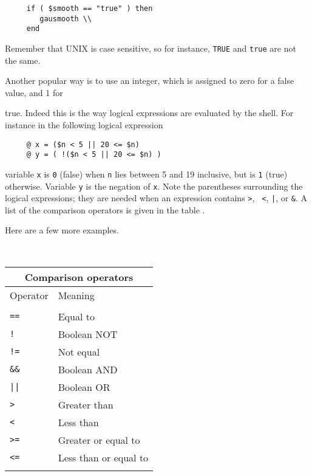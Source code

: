 \small
\begin{verbatim}
     if ( $smooth == "true" ) then
        gausmooth \\
     end
\end{verbatim}
\normalsize
Remember that UNIX is case sensitive, so for instance, {\tt TRUE} and
{\tt true} are not the same.

Another popular way is to use an integer, which is assigned to zero for
a false value, and 1 for 
\begin{minipage}{80mm}
\smallskip
true.  Indeed this is the way logical expressions are evaluated by the
shell.  For instance in the following logical expression

\small
\begin{verbatim}
     @ x = ($n < 5 || 20 <= $n)
     @ y = ( !($n < 5 || 20 <= $n) )
\end{verbatim}
\normalsize
variable {\tt x} is {\tt 0} (false) when {\tt n} lies between 5 and 19
inclusive, but is {\tt 1} (true) otherwise.  Variable {\tt y} is the
negation of {\tt x}.  Note the parentheses surrounding the logical
expressions; they are needed when an expression contains {\tt >}, {\tt
<}, {\tt |}, or {\tt \&}.  A list of the comparison operators is given
in the table .
\smallskip

Here are a few more examples.
\end{minipage}
\ \hfill \
\begin{minipage}{64mm}
\vspace*{3mm}
\begin{tabular}{ll}
\hline
\multicolumn{2}{c}{Comparison operators} \\ \hline
Operator & Meaning \\ \hline
\vspace*{-\medskipamount} \\
{\tt ==} & Equal to \\
{\tt !}  & Boolean NOT \\
{\tt !=} & Not equal \\
{\tt \&\&} & Boolean AND \\
{\tt ||} & Boolean OR \\
{\tt >} & Greater than \\
{\tt <} & Less than \\
{\tt >=} & Greater or equal to \\
{\tt <=} & Less than or equal to \\ 
\vspace*{-\medskipamount} \\ \hline
\end{tabular}
\end{minipage}
\vspace*{1mm}

